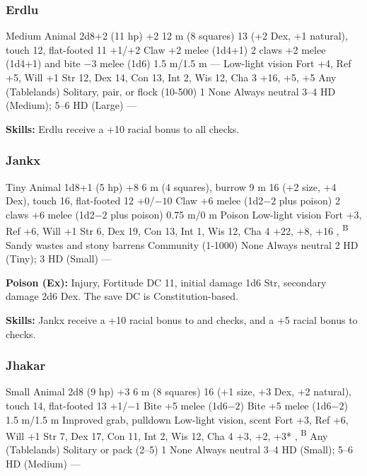 \subsubsection{Erdlu}
\begin{MonsterStats}
{Medium Animal}
{2d8+2 (11 hp)}
{+2}
{12 m (8 squares)}
{13 (+2 Dex, +1 natural), touch 12, flat-footed 11}
{+1/+2}
{Claw +2 melee (1d4+1)}
{2 claws +2 melee (1d4+1) and bite $-3$ melee (1d6)}
{1.5 m/1.5 m}
{---}
{Low-light vision}
{Fort +4, Ref +5, Will +1}
{Str 12, Dex 14, Con 13, Int 2, Wis 12, Cha 3}
{ +16,  +5,  +5}
{}
{Any (Tablelands)}
{Solitary, pair, or flock (10-500)}
{1}
{None}
{Always neutral}
{3--4 HD (Medium); 5--6 HD (Large)}
{---}
\end{MonsterStats}

\textbf{Skills:} Erdlu receive a +10 racial bonus to all  checks.

\subsubsection{Jankx}
\begin{MonsterStats}
{Tiny Animal}
{1d8+1 (5 hp)}
{+8}
{6 m (4 squares), burrow 9 m}
{16 (+2 size, +4 Dex), touch 16, flat-footed 12}
{+0/$-10$}
{Claw +6 melee (1d2$-2$ plus poison)}
{2 claws +6 melee (1d2$-2$ plus poison)}
{0.75 m/0 m}
{Poison}
{Low-light vision}
{Fort +3, Ref +6, Will +1}
{Str 6, Dex 19, Con 13, Int 1, Wis 12, Cha 4}
{ +22,  +8,  +16}
{, \textsuperscript{B}}
{Sandy wastes and stony barrens}
{Community (1-1000)}
{\onehalf}
{None}
{Always neutral}
{2 HD (Tiny); 3 HD (Small)}
{---}
\end{MonsterStats}

\textbf{Poison (Ex):} Injury, Fortitude DC 11, initial damage 1d6 Str, secondary damage 2d6 Dex. The save DC is Constitution-based.

\textbf{Skills:} Jankx receive a +10 racial bonus to  and  checks, and a +5 racial bonus to  checks.

\subsubsection{Jhakar}
\begin{MonsterStats}
{Small Animal}
{2d8 (9 hp)}
{+3}
{6 m (8 squares)}
{16 (+1 size, +3 Dex, +2 natural), touch 14, flat-footed 13}
{+1/$-1$}
{Bite +5 melee (1d6$-2$)}
{Bite +5 melee (1d6$-2$)}
{1.5 m/1.5 m}
{Improved grab, pulldown}
{Low-light vision, scent}
{Fort +3, Ref +6, Will +1}
{Str 7, Dex 17, Con 11, Int 2, Wis 12, Cha 4}
{ +3,  +2,  +3*}
{, \textsuperscript{B}}
{Any (Tablelands)}
{Solitary or pack (2--5)}
{1}
{None}
{Always neutral}
{3--4 HD (Small); 5--6 HD (Medium)}
{---}
\end{MonsterStats}

